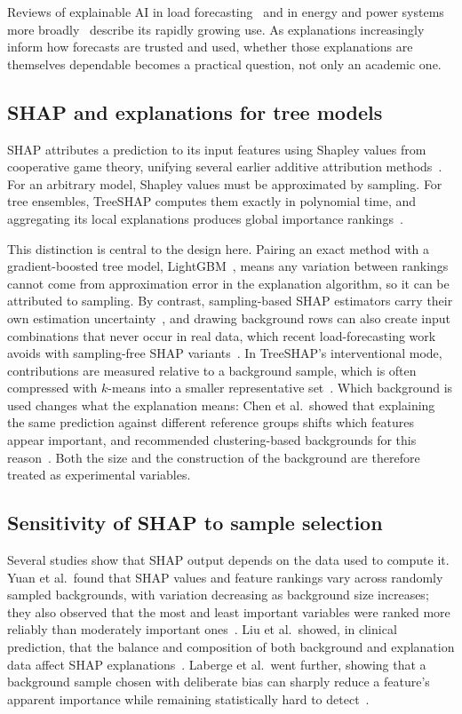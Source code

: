 \documentclass[11pt,a4paper]{article}
\begin{document}
Reviews of explainable AI in load forecasting~\cite{baur2024} and in energy and power systems more broadly~\cite{machlev2022} describe its rapidly growing use. As explanations increasingly inform how forecasts are trusted and used, whether those explanations are themselves dependable becomes a practical question, not only an academic one.

\subsection{SHAP and explanations for tree models}

SHAP attributes a prediction to its input features using Shapley values from cooperative game theory, unifying several earlier additive attribution methods~\cite{lundberg2017}. For an arbitrary model, Shapley values must be approximated by sampling. For tree ensembles, TreeSHAP computes them exactly in polynomial time, and aggregating its local explanations produces global importance rankings~\cite{lundberg2020}.

This distinction is central to the design here. Pairing an exact method with a gradient-boosted tree model, LightGBM~\cite{ke2017}, means any variation between rankings cannot come from approximation error in the explanation algorithm, so it can be attributed to sampling. By contrast, sampling-based SHAP estimators carry their own estimation uncertainty~\cite{slack2021}, and drawing background rows can also create input combinations that never occur in real data, which recent load-forecasting work avoids with sampling-free SHAP variants~\cite{hertel2026}. In TreeSHAP's interventional mode, contributions are measured relative to a background sample, which is often compressed with $k$-means into a smaller representative set~\cite{lundberg2017}. Which background is used changes what the explanation means: Chen et al.\ showed that explaining the same prediction against different reference groups shifts which features appear important, and recommended clustering-based backgrounds for this reason~\cite{chen2022}. Both the size and the construction of the background are therefore treated as experimental variables.

\subsection{Sensitivity of SHAP to sample selection}

Several studies show that SHAP output depends on the data used to compute it. Yuan et al.\ found that SHAP values and feature rankings vary across randomly sampled backgrounds, with variation decreasing as background size increases; they also observed that the most and least important variables were ranked more reliably than moderately important ones~\cite{yuan2023}. Liu et al.\ showed, in clinical prediction, that the balance and composition of both background and explanation data affect SHAP explanations~\cite{liu2022}. Laberge et al.\ went further, showing that a background sample chosen with deliberate bias can sharply reduce a feature's apparent importance while remaining statistically hard to detect~\cite{laberge2023}.
\end{document}
